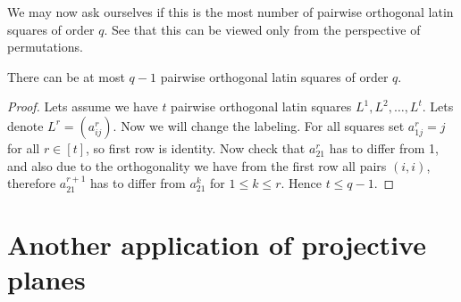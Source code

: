 We may now ask ourselves if this is the most number of pairwise orthogonal latin squares of order $q$. See that this can be viewed only from the perspective of permutations.

\begin{prop}
	There can be at most $q-1$ pairwise orthogonal latin squares of order $q$.
\end{prop}

\begin{proof}
	Lets assume we have $t$ pairwise orthogonal latin squares $L^1, L^2, \dots, L^t$. Lets denote $L^r = (a_{ij}^r)$. Now we will change the labeling. For all squares set $a_{1j}^r = j$  for all $r \in [t]$, so first row is identity. Now check that $a_{21}^r$ has to differ from 1, and also due to the orthogonality we have from the first row all pairs $(i,i)$, therefore $a_{21}^{r+1}$ has to differ from $a_{21}^{k}$ for $1 \leq k \leq r$. Hence $t \leq q-1$.
\end{proof}

\section{Another application of projective planes}